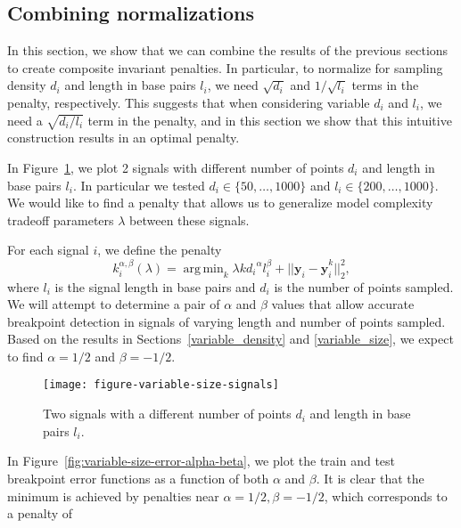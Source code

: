 \documentclass{article}
\DeclareMathOperator*{\argmin}{arg\,min}
\begin{document}
\newpage
\subsection{Combining normalizations}
\label{combining_penalties}
In this section, we show that we can combine the results of the
previous sections to create composite invariant penalties. In
particular, to normalize for sampling density $d_i$ and length in base
pairs $l_i$, we need $\sqrt{d_i}$ and $1/\sqrt{l_i}$ terms in the
penalty, respectively. This suggests that when considering variable
$d_i$ and $l_i$, we need a $\sqrt{d_i/l_i}$ term in the penalty, and
in this section we show that this intuitive construction results in an
optimal penalty.

In Figure~\ref{fig:variable-size-signals}, we plot 2 signals with
different number of points $d_i$ and length in base pairs $l_i$. In
particular we tested $d_i\in\{50, \dots, 1000\}$ and $l_i\in\{200,
\dots, 1000\}$. We would like to find a penalty that allows us to
generalize model complexity tradeoff parameters $\lambda$ between
these signals.

For each signal $i$, we define the penalty
\begin{equation}
  \label{eq:kstar_composite}
  k_i^{\alpha,\beta}(\lambda) = \argmin_k \lambda k {d_i}^\alpha l_i^\beta
  + ||\mathbf y_i - \mathbf{\hat y}_i^k||^2_2,
\end{equation}
where $l_i$ is the signal length in base pairs and $d_i$ is the number
of points sampled. We will attempt to determine a pair of $\alpha$ and
$\beta$ values that allow accurate breakpoint detection in signals of
varying length and number of points sampled. Based on the results in
Sections~\ref{variable_density} and \ref{variable_size}, we expect to
find $\alpha=1/2$ and $\beta=-1/2$.

\begin{figure}[H]
  \centering
\texttt{[image: figure-variable-size-signals]}
  \caption{Two signals with a different number of
    points $d_i$ and length in base pairs $l_i$.}
\label{fig:variable-size-signals}
\end{figure}

\newpage

In Figure~\ref{fig:variable-size-error-alpha-beta}, we plot the train
and test breakpoint error functions as a function of both $\alpha$ and
$\beta$. It is clear that the minimum is achieved by penalties near
$\alpha=1/2, \beta=-1/2$, which corresponds to a penalty of
\end{document}
